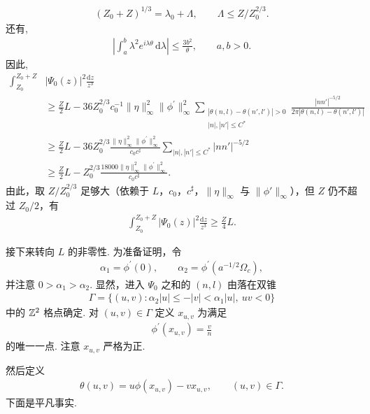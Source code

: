 \begin{align*}
  (Z_{0}+Z)^{1/3}=\lambda_{0}+\Lambda,\qquad
  \Lambda\leq Z/Z_{0}^{2/3}.
\end{align*}
还有,
\begin{align*}
  \left|\int_{a}^{b}\lambda^{2}e^{i\lambda\theta}\,\mathrm{d}\lambda\right|
  \leq\frac{3b^{2}}{\theta},\qquad a,b>0.
\end{align*}
因此,
\begin{align*}
  \int_{Z_{0}}^{Z_{0}+Z}&|\Psi_{0}(z)|^{2}\frac{\mathrm{d}z}{z^{3}}\\
  &\geq\frac{Z}{2}L-36Z_{0}^{2/3}c_{0}^{-1}\|\eta\|_{\infty}^{2}\|\phi^{\prime}\|_{\infty}^{2}
   \sum_{\substack{|\theta(n,l)-\theta(n',l')|>0\\ |n|,|n'|\leq C^{*}}}
   \frac{|nn'|^{-5/2}}{2\pi|\theta(n,l)-\theta(n',l')|}\\
  &\geq\frac{Z}{2}L-36Z_{0}^{2/3}\frac{\|\eta\|_{\infty}^{2}\|\phi^{\prime}\|_{\infty}^{2}}{c_{0}c^{\sharp}}
   \sum_{|n|,|n'|\leq C^{*}}|nn'|^{-5/2}\\
  &\geq\frac{Z}{2}L-Z_{0}^{2/3}\frac{18000\|\eta\|_{\infty}^{2}\|\phi^{\prime}\|_{\infty}^{2}}{c_{0}c^{\sharp}}.
\end{align*}
由此，取 $Z/Z_0^{2/3}$ 足够大（依赖于 $L$，$c_0$，$c^\sharp$，$\|\eta\|_\infty$ 与 $\|\phi'\|_{\infty}$），但 $Z$ 仍不超过 $Z_0/2$，有
\begin{align*}
  \int_{Z_{0}}^{Z_{0}+Z}\left|\Psi_{0}(z)\right|^{2}\frac{\mathrm{d}z}{z^{3}}
  \geq\frac{Z}{4}L.
\end{align*}

接下来转向 $L$ 的非零性. 为准备证明，令
\begin{align*}
  \alpha_{1}=\phi^{\prime}(0),\qquad
  \alpha_{2}=\phi^{\prime}(a^{-1/2}\Omega_{c}),
\end{align*}
并注意 $0 > \alpha_1 > \alpha_2$. 显然，进入 $\Psi_0$ 之和的 $(n,l)$ 由落在双锥
\begin{align*}
  \Gamma=\{(u,v):\alpha_{2}|u|\leq-|v|<\alpha_{1}|u|,\ uv<0\}
\end{align*}
中的 $\mathbb{Z}^2$ 格点确定. 对 $(u, v) \in \Gamma$ 定义 $x_{u,v}$ 为满足
\begin{align*}
  \phi^{\prime}(x_{u,v})=\frac{v}{n}
\end{align*}
的唯一一点. 注意 $x_{u,v}$ 严格为正.

然后定义
\begin{align*}
  \theta(u,v)=u\phi(x_{u,v})-v x_{u,v},\qquad (u,v)\in\Gamma.
\end{align*}
下面是平凡事实.

